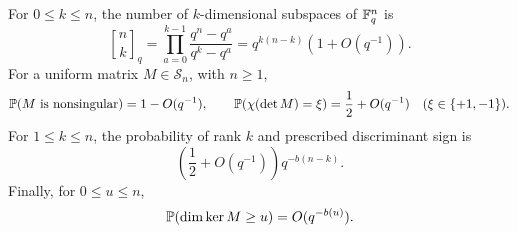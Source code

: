 \begin{lemma}
\label{lem:symmetric-counts}
For $0\leq k\leq n$, the number of $k$-dimensional subspaces of
$\F_q^n$ is
\begin{equation}
\label{eq:transverse-grassmann}
 \genfrac{[}{]}{0pt}{}{n}{k}_q
 =\prod_{a=0}^{k-1}\frac{q^n-q^a}{q^k-q^a}
 =q^{k(n-k)}(1+O(q^{-1})).
\end{equation}
For a uniform matrix $M\in\mathcal S_n$, with $n\geq 1$,
\[
 \P(M\text{ is nonsingular})=1-O(q^{-1}),\qquad
 \P(\chi(\det M)=\xi)=\frac12+O(q^{-1})
 \quad(\xi\in\{+1,-1\}).
\]
For $1\leq k\leq n$, the probability of rank $k$ and prescribed
discriminant sign is
\begin{equation}
\label{eq:transverse-signed-rank}
 \left(\frac12+O(q^{-1})\right)q^{-b(n-k)}.
\end{equation}
Finally, for $0\leq u\leq n$,
\begin{equation}
\label{eq:transverse-nullity}
 \P(\dim\ker M\geq u)=O(q^{-b(u)}).
\end{equation}
\end{lemma}


